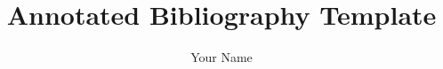 \documentclass[12pt]{article}
\title{\textbf{Annotated Bibliography Template}}
\author{Your Name}
\begin{document}
\maketitle

\nocite{*}



\end{document}
